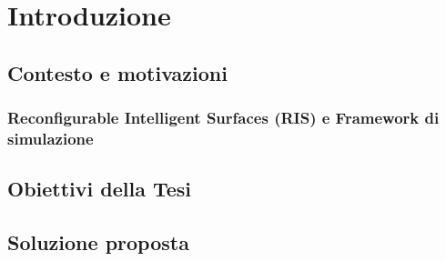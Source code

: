 \chapter{Introduzione}
\label{ch:introduzione}

\section{Contesto e motivazioni}
\label{sec:contesto}

\subsection{Reconfigurable Intelligent Surfaces (RIS) e Framework di simulazione}
\label{subsec:risframework}

\lipsum[1]

\lipsum[1]

\section{Obiettivi della Tesi}
\label{sec:obiettivi}

\lipsum[1]

\section{Soluzione proposta}
\label{sec:soluzione}

\lipsum[1]

